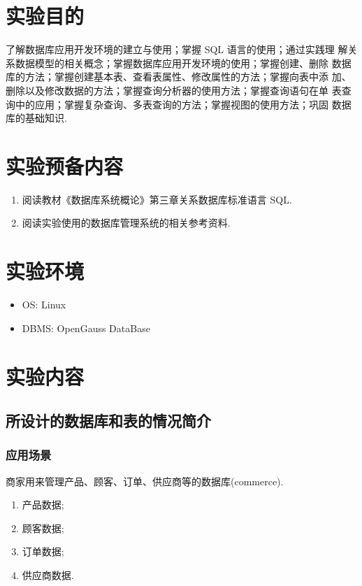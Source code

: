 \section{实验目的}
了解数据库应用开发环境的建立与使用；掌握 SQL 语言的使用；通过实践理
解关系数据模型的相关概念；掌握数据库应用开发环境的使用；掌握创建、删除
数据库的方法；掌握创建基本表、查看表属性、修改属性的方法；掌握向表中添
加、删除以及修改数据的方法；掌握查询分析器的使用方法；掌握查询语句在单
表查询中的应用；掌握复杂查询、多表查询的方法；掌握视图的使用方法；巩固
数据库的基础知识.

\section{实验预备内容}
\begin{enumerate}
  \item 阅读教材《数据库系统概论》第三章关系数据库标准语言 SQL.
  \item 阅读实验使用的数据库管理系统的相关参考资料.
\end{enumerate}

\section{实验环境}
\begin{itemize}
  \item OS: Linux
  \item DBMS: OpenGauss DataBase
\end{itemize}

\section{实验内容}

\subsection{所设计的数据库和表的情况简介}

\subsubsection{应用场景}

商家用来管理产品、顾客、订单、供应商等的数据库(commerce).
\begin{enumerate}
  \item 产品数据;
  \item 顾客数据;
  \item 订单数据;
  \item 供应商数据.
\end{enumerate}

